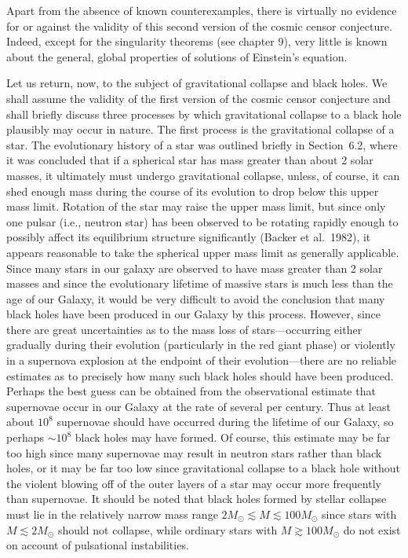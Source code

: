 Apart from the absence of known counterexamples, there is virtually no evidence for
or against the validity of this second version of the cosmic censor conjecture.
Indeed, except for the singularity theorems (see chapter 9), very little is known
about the general, global properties of solutions of Einstein's equation.

Let us return, now, to the subject of gravitational collapse and black holes. We shall
assume the validity of the first version of the cosmic censor conjecture and shall
briefly discuss three processes by which gravitational collapse to a black hole
plausibly may occur in nature. The first process is the gravitational collapse of a
star. The evolutionary history of a star was outlined briefly in Section~6.2, where it
was concluded that if a spherical star has mass greater than about 2 solar masses, it
ultimately must undergo gravitational collapse, unless, of course, it can shed enough
mass during the course of its evolution to drop below this upper mass limit. Rotation
of the star may raise the upper mass limit, but since only one pulsar (i.e., neutron
star) has been observed to be rotating rapidly enough to possibly affect its
equilibrium structure significantly (Backer et al.\ 1982), it appears reasonable to
take the spherical upper mass limit as generally applicable. Since many stars in our
galaxy are observed to have mass greater than 2 solar masses and since the
evolutionary lifetime of massive stars is much less than the age of our Galaxy, it
would be very difficult to avoid the conclusion that many black holes have been
produced in our Galaxy by this process. However, since there are great uncertainties
as to the mass loss of stars---occurring either gradually during their evolution
(particularly in the red giant phase) or violently in a supernova explosion at the
endpoint of their evolution---there are no reliable estimates as to precisely how many
such black holes should have been produced. Perhaps the best guess can be obtained
from the observational estimate that supernovae occur in our Galaxy at the rate of
several per century. Thus at least about \(10^8\) supernovae should have occurred
during the lifetime of our Galaxy, so perhaps \(\sim10^8\) black holes may have
formed. Of course, this estimate may be far too high since many supernovae may
result in neutron stars rather than black holes, or it may be far too low since
gravitational collapse to a black hole without the violent blowing off of the outer
layers of a star may occur more frequently than supernovae. It should be noted that
black holes formed by stellar collapse must lie in the relatively narrow mass range
\(2M_\odot\lesssim M\lesssim100M_\odot\) since stars with \(M\lesssim2M_\odot\)
should not collapse, while ordinary stars with \(M\gtrsim100M_\odot\) do not exist
on account of pulsational instabilities.

